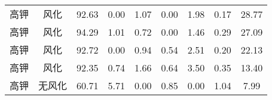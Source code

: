 \documentclass[withoutpreface,bwprint]{cumcmthesis} %
\begin{document}
\begin{itemize}
\begin{table}[!h]
\begin{tabular}{@{}ccccccccc@{}}
			高钾          & 风化            & 92.63                                                          & 0.00                                                         & 1.07                                                         & 0.00                                                         & 1.98                                                           & 0.17                                                           & 28.77                                                           \\
			高钾          & 风化            & 94.29                                                          & 1.01                                                         & 0.72                                                         & 0.00                                                         & 1.46                                                           & 0.29                                                           & 27.09                                                           \\
			高钾          & 风化            & 92.72                                                          & 0.00                                                         & 0.94                                                         & 0.54                                                         & 2.51                                                           & 0.20                                                           & 22.13                                                           \\
			高钾          & 风化            & 92.35                                                          & 0.74                                                         & 1.66                                                         & 0.64                                                         & 3.50                                                           & 0.35                                                           & 13.40                                                           \\
			高钾          & 无风化           & 60.71                                                          & 5.71                                                         & 0.00                                                         & 0.85                                                         & 0.00                                                           & 1.04                                                           & 7.99                                                            \\

\end{tabular}
\end{table}
\end{itemize}
\end{document}
